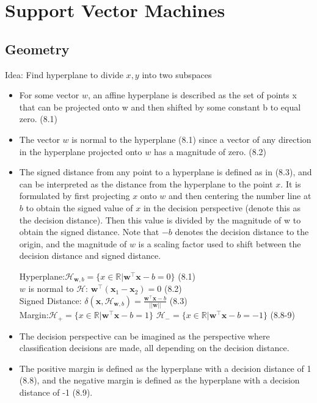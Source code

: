 \documentclass[english]{latex4ei/latex4ei_sheet}
\begin{document}
\section{Support Vector Machines}
\begin{sectionbox}
\subsection{Geometry}
Idea: Find hyperplane to divide $x, y$ into two subspaces
\begin{itemize}
\item For some vector $w$, an affine hyperplane is described as the set of points x that can be projected onto w and then shifted by some constant b to equal zero. (8.1)
\item The vector $w$ is normal to the hyperplane (8.1) since a vector of any direction in the hyperplane projected onto $w$ has a magnitude of zero. (8.2)
\item The signed distance from any point to a hyperplane is defined as in (8.3), and can be interpreted as the distance from the hyperplane to the point $x$. It is formulated by first projecting $x$ onto $w$ and then centering the number line at $b$ to obtain the signed value of $x$ in the decision perspective (denote this as the decision distance). Then this value is divided by the magnitude of w to obtain the signed distance. Note that $-b$ denotes the decision distance to the origin, and the magnitude of $w$ is a scaling factor used to shift between the decision distance and signed distance.
\begin{emphbox}
    Hyperplane:$\mathcal{H}_{\boldsymbol{w},b}=\{x\in \mathbb{R} | \boldsymbol{w}^{\top}\mathbf{x}-b=0\}$ (8.1)\\
    $w$ is normal to $\mathcal{H}$: $\mathbf{w}^{\top}(\mathbf{x}_1-\mathbf{x}_2)=0$ (8.2)\\
    Signed Distance: $\delta(\boldsymbol{x}, \mathcal{H}_{\boldsymbol{w},b})=\frac{\boldsymbol{w^{\top}x}-b}{||\boldsymbol{w}||}$ (8.3)\\
    Margin:$\mathcal{H}_{+}=\{x\in \mathbb{R} | \boldsymbol{w}^{\top}\mathbf{x}-b=1\}$ $\mathcal{H}_{-}=\{x\in \mathbb{R} | \boldsymbol{w}^{\top}\mathbf{x}-b=-1\}$ (8.8-9)
\end{emphbox}
\item The decision perspective can be imagined as the perspective where classification decisions are made, all depending on the decision distance.
\item The positive margin is defined as the hyperplane with a decision distance of 1 (8.8), and the negative margin is defined as the hyperplane with a decision distance of -1 (8.9).
\end{itemize}


\end{sectionbox}
\end{document}
